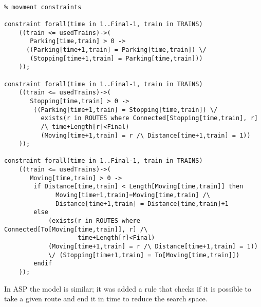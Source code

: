 \documentclass[11pt]{article}
\begin{document}
\begin{verbatim}
      
% movment constraints

constraint forall(time in 1..Final-1, train in TRAINS)
    ((train <= usedTrains)->(
       Parking[time,train] > 0 ->
      ((Parking[time+1,train] = Parking[time,train]) \/
       (Stopping[time+1,train] = Parking[time,train]))
    ));      

constraint forall(time in 1..Final-1, train in TRAINS)
    ((train <= usedTrains)->(
       Stopping[time,train] > 0 ->
        ((Parking[time+1,train] = Stopping[time,train]) \/
          exists(r in ROUTES where Connected[Stopping[time,train], r]
          /\ time+Length[r]<Final)
          (Moving[time+1,train] = r /\ Distance[time+1,train] = 1))
    ));                     
      
constraint forall(time in 1..Final-1, train in TRAINS)
    ((train <= usedTrains)->(
       Moving[time,train] > 0 -> 
        if Distance[time,train] < Length[Moving[time,train]] then 
              Moving[time+1,train]=Moving[time,train] /\
              Distance[time+1,train] = Distance[time,train]+1 
        else 
            (exists(r in ROUTES where Connected[To[Moving[time,train]], r] /\ 
                    time+Length[r]<Final)
            (Moving[time+1,train] = r /\ Distance[time+1,train] = 1)) 
            \/ (Stopping[time+1,train] = To[Moving[time,train]]) 
        endif
    ));  

\end{verbatim}

In ASP the model is similar; it was added a rule that checks if it
is possible to take a given route and end it in time to reduce the search space.
\end{document}
